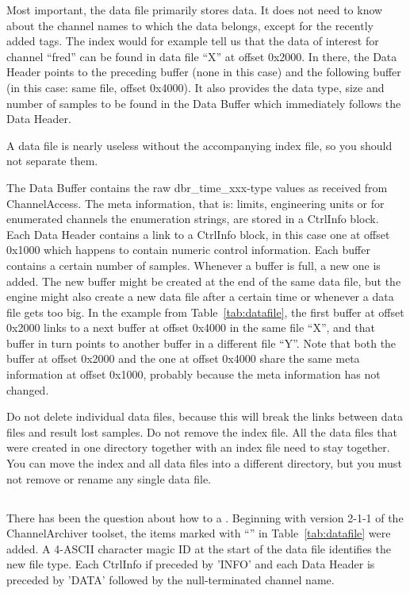 Most important, the data file primarily stores data. It does not need
to know about the channel names to which the data belongs, except for
the recently added \dag tags. The index would for example tell us
that the data of interest for channel ``fred'' can be found in data
file ``X'' at offset 0x2000. In there, the Data Header points to the
preceding buffer (none in this case) and the following buffer (in this
case: same file, offset 0x4000). It also provides the data type, size
and number of samples to be found in the Data Buffer
which immediately follows the Data Header.

 A data file is nearly useless without the
accompanying index file, so you should not separate them.

\noindent The Data Buffer contains the raw dbr\_time\_xxx-type values
as received from ChannelAccess. The meta information, that is: limits,
engineering units or for enumerated channels the enumeration strings,
are stored in a CtrlInfo block. Each Data Header contains a link to a
CtrlInfo block, in this case one at offset 0x1000 which happens to
contain numeric control information.
Each buffer contains a certain number of samples. Whenever a buffer is
full, a new one is added. The new buffer might be created at the end
of the same data file, but the engine might also create a new data
file after a certain time or whenever a data file gets too big.
In the example from Table~\ref{tab:datafile}, the first buffer at offset
0x2000 links to a next buffer at offset 0x4000 in the same file ``X'',
and that buffer in turn points to another buffer in a different file
``Y''. Note that both the buffer at offset 0x2000 and the one at
offset 0x4000 share the same meta information at offset 0x1000,
probably because the meta information has not changed.

 Do not delete individual data
files, because this will break the links between data files and result
lost samples. Do not remove the index file. All the data files that were
created in one directory together with an index file need to stay together.
You can move the index and all data files into a different directory, but
you must not remove or rename any single data file.

\subsection{}
There has been the question about how to  a
.
Beginning with version 2-1-1 of the ChannelArchiver toolset, the items
marked with ``\dag'' in Table~\ref{tab:datafile} were added.  A
4-ASCII character magic ID at the start of the data file identifies
the new file type. Each CtrlInfo if preceded by 'INFO' and each Data
Header is preceded by 'DATA' followed by the null-terminated channel
name.

